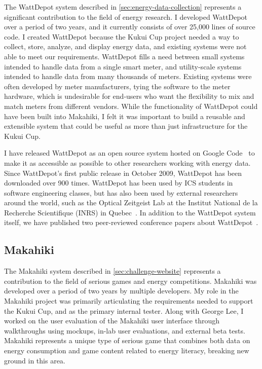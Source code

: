 The WattDepot system described in \autoref{sec:energy-data-collection} represents a significant contribution to the field of energy research. I developed WattDepot over a period of two years, and it currently consists of over 25,000 lines of source code. I created WattDepot because the Kukui Cup project needed a way to collect, store, analyze, and display energy data, and existing systems were not able to meet our requirements. WattDepot fills a need between small systems intended to handle data from a single smart meter, and utility-scale systems intended to handle data from many thousands of meters. Existing systems were often developed by meter manufacturers, tying the software to the meter hardware, which is undesirable for end-users who want the flexibility to mix and match meters from different vendors. While the functionality of WattDepot could have been built into Makahiki, I felt it was important to build a reusable and extensible system that could be useful as more than just infrastructure for the Kukui Cup.

I have released WattDepot as an open source system hosted on Google Code~\cite{WattDepot} to make it as accessible as possible to other researchers working with energy data. Since WattDepot's first public release in October 2009, WattDepot has been downloaded over 900 times. WattDepot has been used by ICS students in software engineering classes, but has also been used by external researchers around the world, such as the Optical Zeitgeist Lab at the Institut National de la Recherche Scientifique (INRS) in Quebec~\cite{esgs-website}. In addition to the WattDepot system itself, we have published two peer-reviewed conference papers about WattDepot~\cite{csdl2-10-05,csdl2-12-06}.


\subsection{Makahiki}

The Makahiki system described in \autoref{sec:challenge-website} represents a contribution to the field of serious games and energy competitions. Makahiki was developed over a period of two years by multiple developers. My role in the Makahiki project was primarily articulating the requirements needed to support the Kukui Cup, and as the primary internal tester. Along with George Lee, I worked on the user evaluation of the Makahiki user interface through walkthroughs using mockups, in-lab user evaluations, and external beta tests. Makahiki represents a unique type of serious game that combines both data on energy consumption and game content related to energy literacy, breaking new ground in this area.

